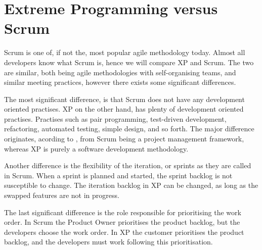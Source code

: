 \section{Extreme Programming versus Scrum}
Scrum is one of, if not the, most popular agile methodology today.
Almost all developers know what Scrum is, hence we will compare XP and Scrum.
The two are similar, both being agile methodologies with self-organising teams, and similar meeting practices, however there exists some significant differences.

The most significant difference, is that Scrum does not have any development oriented practises.
XP on the other hand, has plenty of development oriented practises. Practises such as pair programming, test-driven development, refactoring, automated testing, simple design, and so forth.
The major difference originates, acording to \citet{xp:scrum}, from Scrum being a project management framework, whereas XP is purely a software development methodology.

Another difference is the flexibility of the iteration, or sprints as they are called in Scrum.
When a sprint is planned and started, the sprint backlog is not susceptible to change.
The iteration backlog in XP can be changed, as long as the swapped features are not in progress.

The last significant difference is the role responsible for prioritising the work order.
In Scrum the Product Owner prioritises the product backlog, but the developers choose the work order.
In XP the customer prioritises the product backlog, and the developers must work following this prioritisation. 